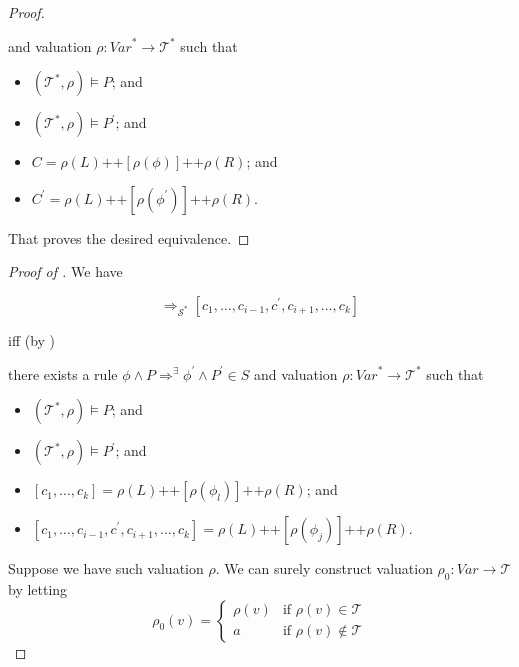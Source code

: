 \begin{proof}
\begin{proofenv}
    and valuation $\rho : \mathit{Var}^* \to \mathcal{T}^*$ such that
    \begin{itemize}
        \item $(\mathcal{T}^*, \rho) \vDash P$; and
        \item $(\mathcal{T}^*, \rho) \vDash P^\prime$; and
        \item $C = \rho(L) \texttt{++} [\rho(\phi)] \texttt{++} \rho(R)$; and
        \item $C^\prime = \rho(L)
        \texttt{++} [\rho(\phi^\prime)] \texttt{++} \rho(R)$.
    \end{itemize}
\end{proofenv}
That proves the desired equivalence.
\end{proof}


\begin{proof}[Proof of ]
We have
\begin{proofenv}
\begin{equation*}
[c_1,\ldots,c_k] \Rightarrow_{\mathcal{S}^*} [c_1, \ldots, c_{i-1}, c^\prime, c_{i+1}, \ldots, c_k]    
\end{equation*}
\end{proofenv}
iff (by )
\begin{proofenv}
there exists a rule $\phi \land P \Rightarrow^\exists \phi^\prime \land P^\prime \in S$
and valuation $\rho : \mathit{Var}^* \to \mathcal{T}^*$ such that
\begin{itemize}
    \item $(\mathcal{T}^*, \rho) \vDash P$; and
    \item $(\mathcal{T}^*, \rho) \vDash P^\prime$; and
    \item $[c_1,\ldots,c_k] = \rho(L) \texttt{++} [\rho(\phi_l)] \texttt{++} \rho(R)$; and
    \item $[c_1, \ldots, c_{i-1}, c^\prime, c_{i+1}, \ldots, c_k] = \rho(L) \texttt{++} [\rho(\phi_j)] 
    \texttt{++} \rho(R)$.
\end{itemize}
\end{proofenv}
Suppose we have such valuation $\rho$.
We can surely construct valuation $\rho_0 : \mathit{Var} \to \mathcal{T}$ by letting
\begin{equation*}
\rho_0(v)=
    \begin{cases}
        \rho(v) & \text{if } \rho(v) \in \mathcal{T}\\
        a & \text{if } \rho(v) \not\in \mathcal{T}
    \end{cases}
\end{equation*}

\end{proof}
